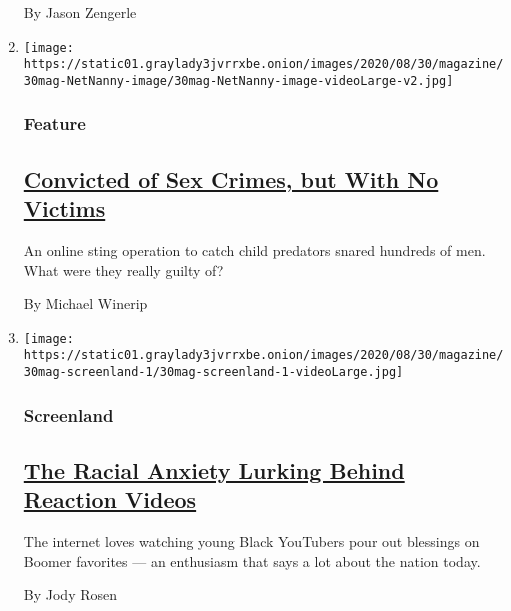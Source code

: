 \begin{enumerate}
  By Jason Zengerle
\item
  \texttt{[image: https://static01.graylady3jvrrxbe.onion/images/2020/08/30/magazine/30mag-NetNanny-image/30mag-NetNanny-image-videoLarge-v2.jpg]}

  \hypertarget{feature-2}{%
  \subsubsection{Feature}\label{feature-2}}

  \hypertarget{convicted-of-sex-crimes-but-with-no-victims}{%
  \subsection{\texorpdfstring{\href{/2020/08/26/magazine/sex-offender-operation-net-nanny.html}{Convicted
  of Sex Crimes, but With No
  Victims}}{Convicted of Sex Crimes, but With No Victims}}\label{convicted-of-sex-crimes-but-with-no-victims}}

  An online sting operation to catch child predators snared hundreds of
  men. What were they really guilty of?

  By Michael Winerip
\item
  \texttt{[image: https://static01.graylady3jvrrxbe.onion/images/2020/08/30/magazine/30mag-screenland-1/30mag-screenland-1-videoLarge.jpg]}

  \hypertarget{screenland}{%
  \subsubsection{Screenland}\label{screenland}}

  \hypertarget{the-racial-anxiety-lurking-behind-reaction-videos}{%
  \subsection{\texorpdfstring{\href{/2020/08/27/magazine/the-racial-anxiety-lurking-behind-reaction-videos.html}{The
  Racial Anxiety Lurking Behind Reaction
  Videos}}{The Racial Anxiety Lurking Behind Reaction Videos}}\label{the-racial-anxiety-lurking-behind-reaction-videos}}

  The internet loves watching young Black YouTubers pour out blessings
  on Boomer favorites --- an enthusiasm that says a lot about the nation
  today.

  By Jody Rosen
\end{enumerate}

